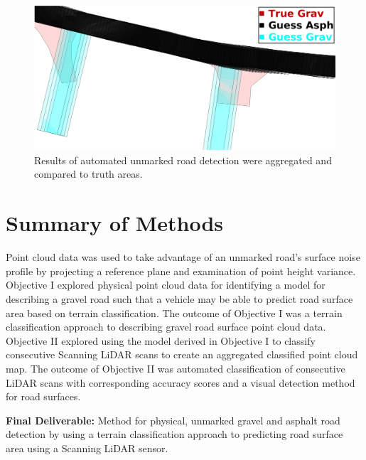 \documentclass[numbered,pdftex]{ohio-etd}
\begin{document}
{{{{{				\begin{figure}[H]
					\centering
					\includegraphics[width=0.9\linewidth]{Defense_Images/auto_guess_v_truth}
					\caption[Projected Automated Guess vs Truth]{Results of automated unmarked road detection were aggregated and compared to truth areas.}
					\label{fig:auto_guess_v_truth}
				\end{figure}	
				
			}
		
		} %

	} %
	
} %


\newpage
	
	
	\section{Summary of Methods}\label{sec:summary-of-methods}
	{
		
		{Point cloud data was used to take advantage of an unmarked road's surface noise profile by projecting a reference plane and examination of point height variance. Objective I explored physical point cloud data for identifying a model for describing a gravel road such that a vehicle may be able to predict road surface area based on terrain classification. The outcome of Objective I was a terrain classification approach to describing gravel road surface point cloud data. Objective II explored using the model derived in Objective I to classify consecutive Scanning LiDAR scans to create an aggregated classified point cloud map. The outcome of Objective II was automated classification of consecutive LiDAR scans with corresponding accuracy scores and a visual detection method for road surfaces.}
		 
		{\textbf{Final Deliverable:} Method for physical, unmarked gravel and asphalt road detection by using a terrain classification approach to predicting road surface area using a Scanning LiDAR sensor.}
		
}}
\end{document}
